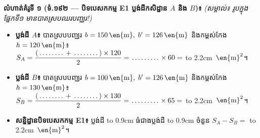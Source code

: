 \documentclass[a4paper,10pt]{article}
\newcommand{\unit}[1]{\,\text{\en{#1}}}
\newcommand{\blank}[1]{\leavevmode\hbox to #1{\dotfill}}
\begin{document}
\begin{tcolorbox}[
  enhanced, sharp corners, colback=white, colframe=black,
  boxrule=0.95pt, boxsep=2pt, top=3.5pt, bottom=3.5pt, left=6pt, right=6pt, after skip=4pt
]
  \textbf{លំហាត់គំរូទី ១ (ទំ.១៩២ — បិទបេសកកម្ម E1 ប្លង់ដីកសិដ្ឋាន $A$ និង $B$)៖} \textit{(សម្គាល់៖ រូបក្នុងផ្នែកទី១ មានបាតស្របឈរបញ្ឈរ!)}
  \begin{itemize}[leftmargin=1.2em, itemsep=2.5pt, topsep=2pt]
    \item \textbf{ប្លង់ដី $A$៖} បាតស្របបញ្ឈរ $b = 150\unit{m},\; b' = 126\unit{m}$ និងកម្ពស់កែង $h = 120\unit{m}$៖\\
    \hspace*{0.4cm}$S_A = \dfrac{(\blank{1.3cm} + \blank{1.3cm}) \times 120}{2} = \blank{1.4cm} \times 60 =$ \blank{2.2cm} $\unit{m}^2$។
    \item \textbf{ប្លង់ដី $B$៖} បាតស្របបញ្ឈរ $b = 100\unit{m},\; b' = 126\unit{m}$ និងកម្ពស់កែង $h = 130\unit{m}$៖\\
    \hspace*{0.4cm}$S_B = \dfrac{(\blank{1.3cm} + \blank{1.3cm}) \times 130}{2} = \blank{1.4cm} \times 65 =$ \blank{2.2cm} $\unit{m}^2$។
    \item \textbf{សន្និដ្ឋានបិទបេសកកម្ម E1៖} ប្លង់ដី \blank{0.9cm} ធំជាងប្លង់ដី \blank{0.9cm} ចំនួន $S_A - S_B =$ \blank{2.2cm} $\unit{m}^2$។
  \end{itemize}
\end{tcolorbox}
\end{document}
